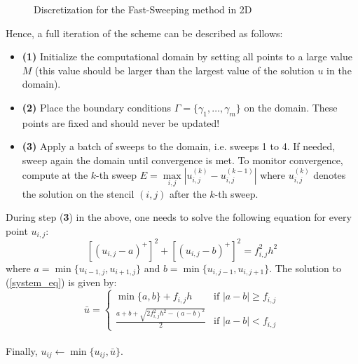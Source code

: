 \documentclass[11pt]{article}
\theoremstyle{definition}
\theoremstyle{remark}
\begin{document}
\begin{figure}[h!]
    \centering
    \caption{Discretization for the Fast-Sweeping method in 2D}
    \label{fig:graph_discretization}
\end{figure}

\noindent Hence, a full iteration of the scheme can be described as follows:
\begin{itemize}
    \item \textbf{(1)} Initialize the computational domain by setting all points to a large value $M$ (this value should be larger than the largest value of the solution $u$ in the domain).
    \item \textbf{(2)} Place the boundary conditions $\Gamma=\{\gamma_1,\dots,\gamma_m\}$ on the domain. These points are fixed and should never be updated!
    \item \textbf{(3)} Apply a batch of sweeps to the domain, i.e. sweeps 1 to 4. If needed, sweep again the domain until convergence is met. To monitor convergence, compute at the $k$-th sweep $E = \max\limits_{i,j} \left| u_{i,j}^{(k)} - u_{i,j}^{(k-1)} \right|$ where $u_ {i,j}^{(k)}$ denotes the solution on the stencil $(i,j)$ after the $k$-th sweep.
\end{itemize}
\noindent During step (\textbf{3}) in the above, one needs to solve the following equation for every point $u_{i,j}$:
\begin{equation}
\label{system_eq}
    [(u_{i,j}-a)^{+}]^2+[(u_{i,j}-b)^{+}]^2=f_{i,j}^2h^2
\end{equation}
\noindent where $a=\min\{u_{i-1,j},u_{i+1,j}\}$ and $b=\min\{u_{i,j-1},u_{i,j+1}\}$. The solution to (\ref{system_eq}) is given by:
\begin{equation*}
    \bar{u}=\begin{cases}
        \min\{a,b\}+f_{i,j}h & \text {if }|a-b|\geq f_{i,j} \\
        \frac{a+b+\sqrt{2f_{i,j}^2h^2-(a-b)^2}}{2} & \text {if }|a-b|< f_{i,j}
    \end{cases}
\end{equation*} \\
\noindent Finally, $u_{ij}\leftarrow\min\{u_{ij},\bar{u}\}$.
\end{document}
